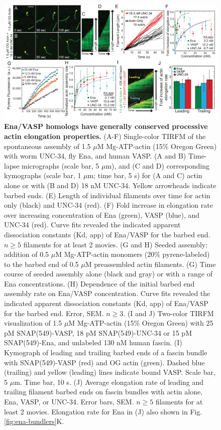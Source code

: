 \begin{figure}
\centering
\includegraphics[width=\textwidth]{img/ch02/Supp_Figure_1.pdf}
\caption[Ena/VASP homologs have generally conserved processive actin elongation properties.]{\textbf{Ena/VASP homologs have generally conserved processive actin elongation properties.} (A-F) Single-color TIRFM of the spontaneous assembly of 1.5 $\mu$M Mg-ATP-actin (15\% Oregon Green) with worm UNC-34, fly Ena, and human VASP. (A and B) Time-lapse micrographs (scale bar, 5 $\mu$m), and (C and D) corresponding kymographs (scale bar, 1 $\mu$m; time bar, 5 s) for (A and C) actin alone or with (B and D) 18 nM UNC-34. Yellow arrowheads indicate barbed ends. (E) Length of individual filaments over time for actin only (black) and UNC-34 (red). (F) Fold increase in elongation rate over increasing concentration of Ena (green), VASP (blue), and UNC-34 (red). Curve fits revealed the indicated apparent dissociation constants (Kd, app) of Ena/VASP for the barbed end. $n \geq 5$ filaments for at least 2 movies. (G and H) Seeded assembly: addition of 0.5 $\mu$M Mg-ATP-actin monomers (20\% pyrene-labeled) to the barbed end of 0.5 $\mu$M preassembled actin filaments. (G) Time course of seeded assembly alone (black and gray) or with a range of Ena concentrations. (H) Dependence of the initial barbed end assembly rate on Ena/VASP concentration. Curve fits revealed the indicated apparent dissociation constants (Kd, app) of Ena/VASP for the barbed end. Error, SEM. $n \geq 3$. (I and J) Two-color TIRFM visualization of 1.5 $\mu$M Mg-ATP-actin (15\% Oregon Green) with 25 pM SNAP(549)-VASP, 18 pM SNAP(549)-UNC-34 or 15 pM SNAP(549)-Ena, and unlabeled 130 nM human fascin. (I) Kymograph of leading and trailing barbed ends of a fascin bundle with SNAP(549)-VASP (red) and OG actin (green). Dashed blue (trailing) and yellow (leading) lines indicate bound VASP. Scale bar, 5 $\mu$m. Time bar, 10 s. (J) Average elongation rate of leading and trailing filament barbed ends on fascin bundles with actin alone, Ena, VASP, or UNC-34. Error bars, SEM. $n \geq 5$ filaments for at least 2 movies. Elongation rate for Ena in (J) also shown in Fig. \ref{fig:ena-bundlers}K.}
\label{fig:ena-homologs}
\end{figure}

